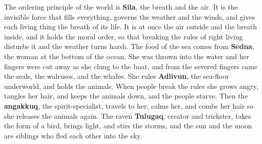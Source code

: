 The ordering principle of the world is \textbf{Sila}, the breath and the air. It is the invisible force that fills everything, governs the weather and the winds, and gives each living thing the breath of its life. It is at once the air outside and the breath inside, and it holds the moral order, so that breaking the rules of right living disturbs it and the weather turns harsh. The food of the sea comes from \textbf{Sedna}, the woman at the bottom of the ocean. She was thrown into the water and her fingers were cut away as she clung to the boat, and from the severed fingers came the seals, the walruses, and the whales. She rules \textbf{Adlivun}, the sea-floor underworld, and holds the animals. When people break the rules she grows angry, tangles her hair, and keeps the animals down, and the people starve. Then the \textbf{angakkuq}, the spirit-specialist, travels to her, calms her, and combs her hair so she releases the animals again. The raven \textbf{Tulugaq}, creator and trickster, takes the form of a bird, brings light, and stirs the storms, and the sun and the moon are siblings who fled each other into the sky.
